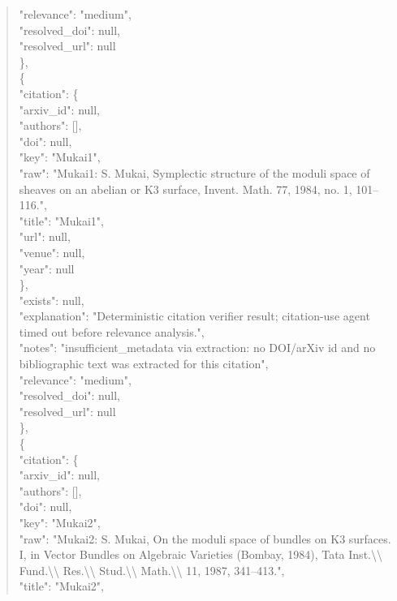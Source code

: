 \documentclass[11pt]{article}
\begin{document}
\begin{quote}
      "relevance": "medium",\\
      "resolved\_doi": null,\\
      "resolved\_url": null\\
    \},\\
    \{\\
      "citation": \{\\
        "arxiv\_id": null,\\
        "authors": [],\\
        "doi": null,\\
        "key": "Mukai1",\\
        "raw": "Mukai1: S. Mukai, Symplectic structure of the moduli space of sheaves on an abelian or K3 surface, Invent. Math. 77, 1984, no. 1, 101--116.",\\
        "title": "Mukai1",\\
        "url": null,\\
        "venue": null,\\
        "year": null\\
      \},\\
      "exists": null,\\
      "explanation": "Deterministic citation verifier result; citation-use agent timed out before relevance analysis.",\\
      "notes": "insufficient\_metadata via extraction: no DOI/arXiv id and no bibliographic text was extracted for this citation",\\
      "relevance": "medium",\\
      "resolved\_doi": null,\\
      "resolved\_url": null\\
    \},\\
    \{\\
      "citation": \{\\
        "arxiv\_id": null,\\
        "authors": [],\\
        "doi": null,\\
        "key": "Mukai2",\\
        "raw": "Mukai2: S. Mukai, On the moduli space of bundles on K3 surfaces. I, in Vector Bundles on Algebraic Varieties (Bombay, 1984), Tata Inst.\textbackslash{}\textbackslash{} Fund.\textbackslash{}\textbackslash{} Res.\textbackslash{}\textbackslash{} Stud.\textbackslash{}\textbackslash{} Math.\textbackslash{}\textbackslash{} 11, 1987, 341--413.",\\
        "title": "Mukai2",\\

\end{quote}
\end{document}
